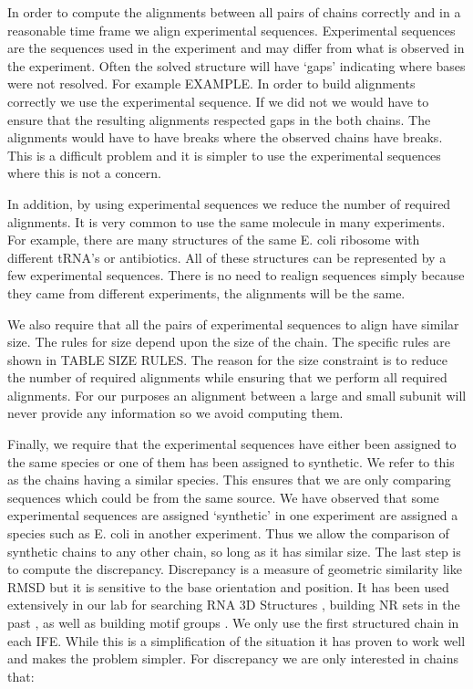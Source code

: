 In order to compute the alignments between all pairs of chains correctly and in
a reasonable time frame we align experimental sequences. Experimental sequences
are the sequences used in the experiment and may differ from what is observed in
the experiment. Often the solved structure will have ‘gaps’ indicating where
bases were not resolved. For example EXAMPLE. In order to build alignments
correctly we use the experimental sequence. If we did not we would have to
ensure that the resulting alignments respected gaps in the both chains. The
alignments would  have to have breaks where the observed chains have breaks.
This is a difficult problem and it is simpler to use the experimental sequences
where this is not a concern.

In addition, by using experimental sequences we reduce the number of required
alignments. It is very common to use the same molecule in many experiments. For
example, there are many structures of the same E. coli ribosome with different
tRNA’s or antibiotics. All of these structures can be represented by a few
experimental sequences. There is no need to realign sequences simply because
they came from different experiments, the alignments will be the same.

We also require that all the pairs of experimental sequences to align  have
similar size. The rules for size depend upon the size of the chain. The specific
rules are shown in TABLE SIZE RULES. The reason for the size constraint is to
reduce the number of required alignments while ensuring that we perform all
required alignments. For our purposes an alignment between a large and small
subunit will never provide any information so we avoid computing them.

Finally, we require that the experimental sequences have either been assigned to
the same species or one of them has been assigned to synthetic. We refer to this
as the chains having a similar species. This ensures that we are only comparing
sequences which could be from the same source. We have observed that some
experimental sequences are assigned ‘synthetic’ in one experiment are assigned a
species such as E. coli in another experiment. Thus we allow the comparison of
synthetic chains to any other chain, so long as it has similar size. The last
step is to compute the discrepancy. Discrepancy is a measure of geometric
similarity like RMSD but it is sensitive to the base orientation and position.
It has been used extensively in our lab for searching RNA 3D Structures
\cite{Sarver2008a}, building NR sets in the past \cite{Leontis2012b}, as well as
building motif groups \cite{Petrov2013}. We only use the first structured chain
in each IFE. While this is a simplification of the situation it has proven to
work well and makes the problem simpler. For discrepancy we are only interested
in chains that:

